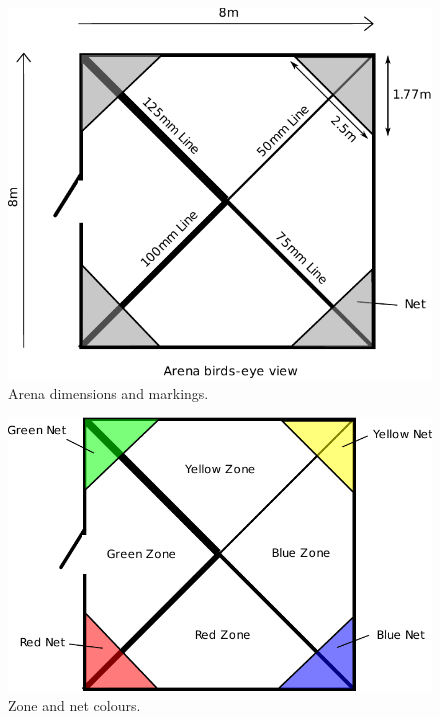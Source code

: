 \begin{figure}
\begin{center}
\includegraphics[keepaspectratio, width=\textwidth]{./images/arenadim.pdf}
\caption{\label{fig:arena}Arena dimensions and markings.}
\end{center}
\end{figure}

\begin{figure}
\begin{center}
\includegraphics[keepaspectratio, scale =1]{./images/colours.pdf}
\caption{\label{fig:zone}Zone and net colours.}
\end{center}
\end{figure}

